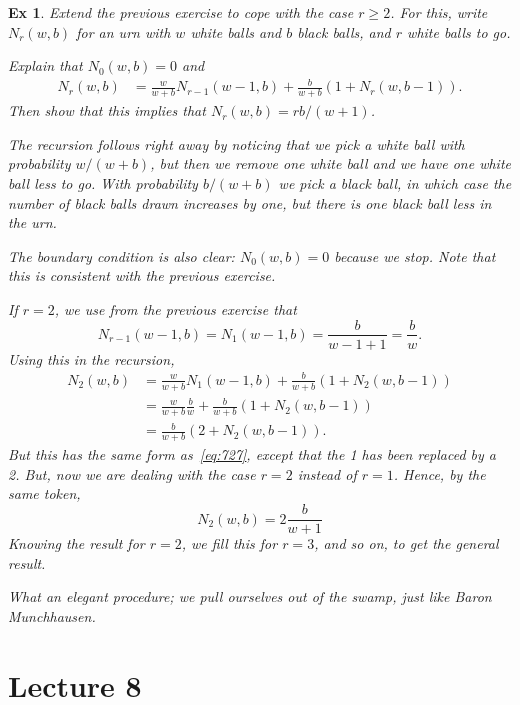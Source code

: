 \documentclass[a4paper,11pt]{article}
\newtheorem{exercise}[theorem]{Ex}
\begin{document}
\begin{exercise}
Extend the previous exercise to cope with the case $r\geq 2$.
For this, write $N_{r}(w,b)$ for an urn with $w$ white balls and $b$ black balls, and $r$ white balls to go.
\begin{hint}
Explain that $N_{0}(w,b) = 0$ and
\begin{align}
  N_r(w,b) &= \frac{w}{w+b} N_{r-1}(w-1, b) +  \frac{b}{w+b} (1+N_{r}(w, b-1)).
\end{align}
Then show that this implies that $N_{r}(w,b) = r b/ (w+1)$.
\end{hint}
\begin{solution}
The recursion follows right away by noticing that we pick a white ball with probability $w/(w+b)$, but then we remove one white ball \emph{and} we have one white ball less to go.
With probability $b/(w+b)$ we pick a black ball, in which case the number of black balls drawn increases by one, but there is one black ball less in the urn.

The boundary condition is also clear: $N_{0}(w,b)=0$ because we stop.
Note that this is consistent with the previous exercise.

If $r=2$, we use from the previous exercise that
\begin{equation*}
N_{r-1}(w-1, b) = N_{1}(w-1, b) = \frac{b }{w-1 + 1} = \frac{b }{w}.
\end{equation*}
Using this in the recursion,
\begin{align*}
  N_2(w,b)
&= \frac{w}{w+b} N_{1}(w-1, b) +  \frac{b}{w+b} (1+N_{2}(w, b-1)) \\
&= \frac{w}{w+b} \frac{b }{w} +  \frac{b}{w+b} (1+N_{2}(w, b-1)) \\
&=  \frac{b}{w+b} (2+N_{2}(w, b-1)).
\end{align*}
But this has the same form as~\cref{eq:727}, except that the 1 has been replaced by a 2. But, now we are dealing with the case $r=2$ instead of $r=1$. Hence, by the same token,
\begin{equation*}
  N_2(w,b) = 2 \frac{b}{w+1}
\end{equation*}
Knowing the result for $r=2$, we fill this for $r=3$, and so on, to get the general result.

What an elegant procedure;  we pull ourselves out of the swamp, just like Baron Munchhausen.
\end{solution}
\end{exercise}

\section{Lecture 8}
\end{document}
